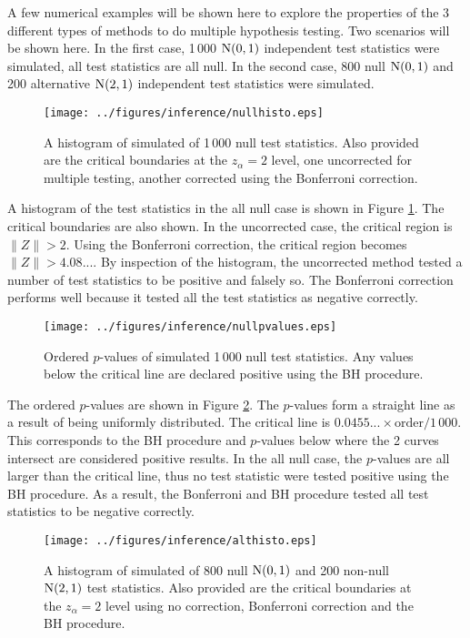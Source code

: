 A few numerical examples will be shown here to explore the properties of the 3 different types of methods to do multiple hypothesis testing. Two scenarios will be shown here. In the first case, 1\,000 $\operatorname{N}(0,1)$ independent test statistics were simulated, all test statistics are all null. In the second case, 800 null $\operatorname{N}(0,1)$ and 200 alternative $\operatorname{N}(2,1)$ independent test statistics were simulated. 

\begin{figure}
	\centering
	\texttt{[image: ../figures/inference/nullhisto.eps]}
	\caption{A histogram of simulated of 1\,000 null test statistics. Also provided are the critical boundaries at the $z_\alpha=2$ level, one uncorrected for multiple testing, another corrected using the Bonferroni correction.}
	\label{fig:inference_nullhisto}
\end{figure}

A histogram of the test statistics in the all null case is shown in Figure \ref{fig:inference_nullhisto}. The critical boundaries are also shown. In the uncorrected case, the critical region is $\|Z\|>2$. Using the Bonferroni correction, the critical region becomes $\|Z\|>4.08...$. By inspection of the histogram, the uncorrected method tested a number of test statistics to be positive and falsely so. The Bonferroni correction performs well because it tested all the test statistics as negative correctly.

\begin{figure}
	\centering
	\texttt{[image: ../figures/inference/nullpvalues.eps]}
	\caption{Ordered $p$-values of simulated 1\,000 null test statistics. Any values below the critical line are declared positive using the BH procedure.}
	\label{fig:inference_nullpvalues}
\end{figure} 

The ordered $p$-values are shown in Figure \ref{fig:inference_nullpvalues}. The $p$-values form a straight line as a result of being uniformly distributed. The critical line is $0.0455...\times\text{order}/1\,000$. This corresponds to the BH procedure and $p$-values below where the 2 curves intersect are considered positive results. In the all null case, the $p$-values are all larger than the critical line, thus no test statistic were tested positive using the BH procedure. As a result, the Bonferroni and BH procedure tested all test statistics to be negative correctly.

\begin{figure}
	\centering
	\texttt{[image: ../figures/inference/althisto.eps]}
	\caption{A histogram of simulated of 800 null $\operatorname{N}(0,1)$ and 200 non-null $\operatorname{N}(2,1)$ test statistics. Also provided are the critical boundaries at the $z_\alpha=2$ level using no correction, Bonferroni correction and the BH procedure.}
	\label{fig:inference_althisto}
\end{figure}

